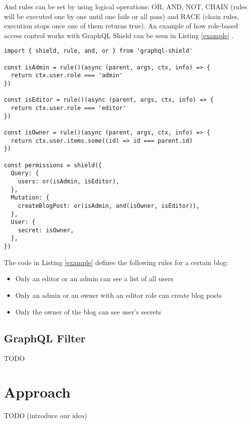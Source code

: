 \documentclass[conference]{IEEEtran}
\begin{document}
And rules can be set by using logical operations: OR, AND, NOT, CHAIN (rules will be executed one by one until one fails or all pass) and RACE (chain rules, execution stops once one of them returns true). An example of how role-based access control works with GraphQL Shield can be seen in Listing \ref{example} .

\label{example}
\begin{lstlisting}[label=example,caption=Role-based Access Control \cite{b1}]
import { shield, rule, and, or } from 'graphql-shield'

const isAdmin = rule()(async (parent, args, ctx, info) => {
  return ctx.user.role === 'admin'
})

const isEditor = rule()(async (parent, args, ctx, info) => {
  return ctx.user.role === 'editor'
})

const isOwner = rule()(async (parent, args, ctx, info) => {
  return ctx.user.items.some((id) => id === parent.id)
})

const permissions = shield({
  Query: {
    users: or(isAdmin, isEditor),
  },
  Mutation: {
    createBlogPost: or(isAdmin, and(isOwner, isEditor)),
  },
  User: {
    secret: isOwner,
  },
})
\end{lstlisting}

The code in Listing \ref{example} defines the following rules for a certain blog:

\begin{itemize}
    \item Only an editor or an admin can see a list of all users
    \item Only an admin or an owner with an editor role can create blog posts
    \item Only the owner of the blog can see user's secrets
\end{itemize}


\subsection{GraphQL Filter}\label{filter}

TODO

\section{Approach}\label{approach}

TODO (introduce our idea)
\end{document}
